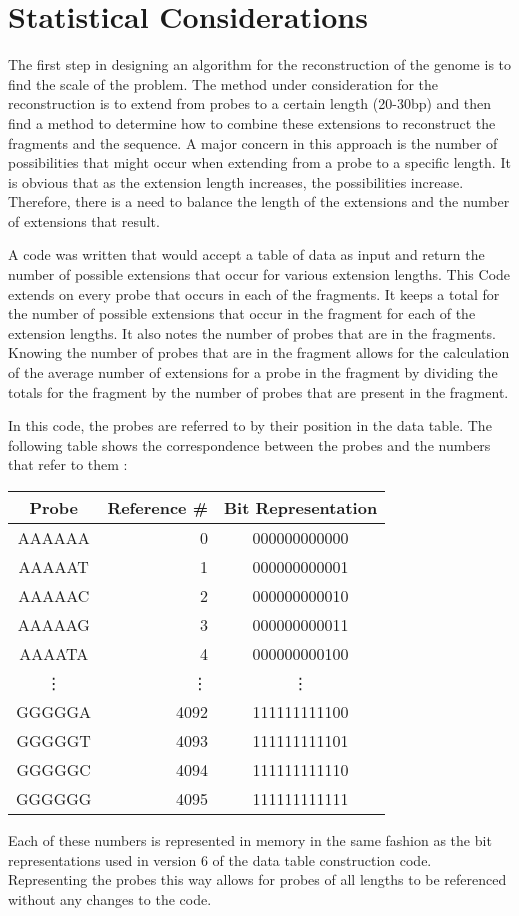 \section{Statistical Considerations}

The first step in designing an algorithm for the reconstruction of the
genome is to find the scale of the problem.  The method under
consideration for the reconstruction is to extend from
probes to a certain length (20-30bp) and then find a method to determine
how to combine these extensions to reconstruct the fragments and the sequence.
A major concern in this approach is the number of possibilities that might
occur when
extending from a probe to a specific length.  It is obvious that as the
extension length increases, the possibilities increase.  Therefore, there
is a need to balance the length of the extensions and the number of
extensions that result.

A code was written that would accept a table of data as
input and return the number of possible extensions that occur for
various extension lengths.  This Code extends on every probe that
occurs in each of the fragments.  It keeps a total for the number of
possible extensions that occur in the fragment for each of the extension
lengths.  It also
notes the number of probes that are in the fragments.  Knowing the number
of probes that are in the fragment allows for the calculation of the
average number of extensions for a probe in the fragment by dividing the
totals for the fragment by the number of probes that are present in the
fragment.

In this code, the probes are referred to by their position in the data table.
The following table shows the correspondence between the probes and the
numbers that refer to them :
\begin{center}
\begin{tabular}{||c|r|c||} \hline
Probe  & Reference \# & Bit Representation \\ \hline
AAAAAA & 0 & 000000000000 \\
AAAAAT & 1 & 000000000001 \\
AAAAAC & 2 & 000000000010 \\
AAAAAG & 3 & 000000000011 \\
AAAATA & 4 & 000000000100 \\
\vdots & \vdots & \vdots \\
GGGGGA & 4092 & 111111111100 \\
GGGGGT & 4093 & 111111111101 \\
GGGGGC & 4094 & 111111111110 \\
GGGGGG & 4095 & 111111111111 \\ \hline
\end{tabular}
\end{center}
Each of these numbers is represented in memory in the same fashion as the
bit representations used in version 6 of the data table construction code.
Representing the probes this way allows for probes of all lengths to be
referenced without any changes to the code.

